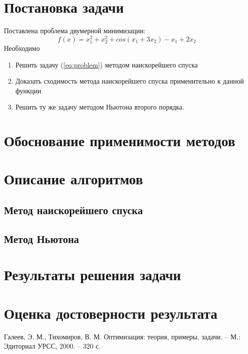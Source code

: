 \documentclass[main.tex]{subfiles}
\begin{document}
	
\section{Постановка задачи}
Поставлена проблема двумерной минимизации:
\begin{equation}\label{eq:problem}
f(x)=x_1^2+x_2^2+cos(x_1+3x_2)-x_1+2x_2
\end{equation}
Необходимо
\begin{enumerate}
	\item Решить задачу (\ref{eq:problem}) методом наискорейшего спуска
	\item Доказать сходимость метода наискорейшего спуска применительно к данной функции
	\item Решить ту же задачу методом Ньютона второго порядка.
\end{enumerate}

\section{Обоснование применимости методов}
\section{Описание алгоритмов}
\subsection{Метод наискорейшего спуска}
\subsection{Метод Ньютона}

\section{Результаты решения задачи}
\section{Оценка достоверности результата}

\begin{thebibliography}{99}
	 Галеев, Э. М., Тихомиров, В. М. Оптимизация: теория, примеры, задачи. -- М.: Эдиториал УРСС, 2000. -- 320 с.
\end{thebibliography}
\end{document}
